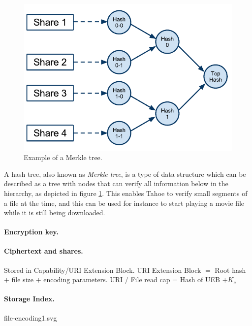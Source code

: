 \documentclass[english,12pt,a4paper]{book}
\begin{document}
\begin{figure}[h]
    \centering
    \includegraphics[width=0.9\columnwidth]{Tahoe-MerkleTree.pdf}
    \caption{Example of a Merkle tree.}
    \label{fig:tahoemerkletree}
\end{figure}

A hash tree, also known as \emph{Merkle tree}, is a type of data structure
which can be described as a tree with nodes that can verify all information
below in the hierarchy, as depicted in figure \ref{fig:tahoemerkletree}. This
enables Tahoe to verify small segments of a file at the time, and this can be
used for instance to start playing a movie file while it is still being
downloaded.

\paragraph{Encryption key.}

\paragraph{Ciphertext and shares.}

Stored in Capability/URI Extension Block.
URI Extension Block $=$ Root hash $+$ file size $+$ encoding parameters.
URI / File read cap = Hash of UEB $+ K_c$

\paragraph{Storage Index.}

file-encoding1.svg
\end{document}
